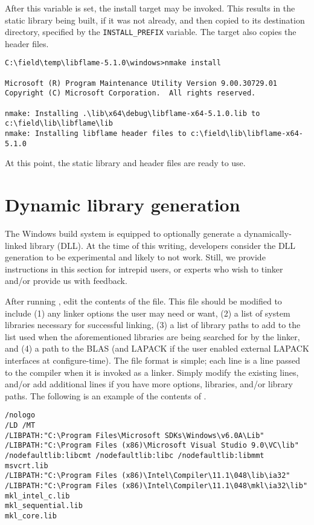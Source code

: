 \noindent
After this variable is set, the \nmake install target may be invoked.
This results in the static library being built, if it was not already, and
then copied to its destination directory, specified by the
{\tt INSTALL\_PREFIX} \nmake variable.
The \install target also copies the \libflame header files.

\begin{Verbatim}[frame=single,framesep=2.5mm,xleftmargin=5mm,fontsize=\footnotesize]
C:\field\temp\libflame-5.1.0\windows>nmake install

Microsoft (R) Program Maintenance Utility Version 9.00.30729.01
Copyright (C) Microsoft Corporation.  All rights reserved.

nmake: Installing .\lib\x64\debug\libflame-x64-5.1.0.lib to c:\field\lib\libflame\lib
nmake: Installing libflame header files to c:\field\lib\libflame-x64-5.1.0
\end{Verbatim}

At this point, the static library and header files are ready to use.



\section{Dynamic library generation}
\label{sec:dll}

The Windows build system is equipped to optionally generate a
dynamically-linked library (DLL).
At the time of this writing, \libflame developers consider the DLL generation
to be experimental and likely to not work.
Still, we provide instructions in this section for intrepid users,
or experts who wish to tinker and/or provide us with feedback.

After running \configurecmdns, edit the contents of the \linkargs file.
This file should be modified to include (1) any linker options the user
may need or want, (2) a list of system libraries necessary for
successful linking, (3) a list of library paths to add to the list
used when the aforementioned libraries are being searched for by the linker,
and (4) a path to the BLAS (and LAPACK if the user enabled external
LAPACK interfaces at configure-time).
The file format is simple; each line is a line passed to the compiler when
it is invoked as a linker.
Simply modify the existing lines, and/or add additional lines if you have
more options, libraries, and/or library paths.
The following is an example of the contents of \linkargsns.

\begin{Verbatim}[frame=single,framesep=2.5mm,xleftmargin=5mm,fontsize=\footnotesize]
/nologo
/LD /MT
/LIBPATH:"C:\Program Files\Microsoft SDKs\Windows\v6.0A\Lib"
/LIBPATH:"C:\Program Files (x86)\Microsoft Visual Studio 9.0\VC\lib"
/nodefaultlib:libcmt /nodefaultlib:libc /nodefaultlib:libmmt
msvcrt.lib
/LIBPATH:"C:\Program Files (x86)\Intel\Compiler\11.1\048\lib\ia32"
/LIBPATH:"C:\Program Files (x86)\Intel\Compiler\11.1\048\mkl\ia32\lib"
mkl_intel_c.lib
mkl_sequential.lib
mkl_core.lib
\end{Verbatim}

